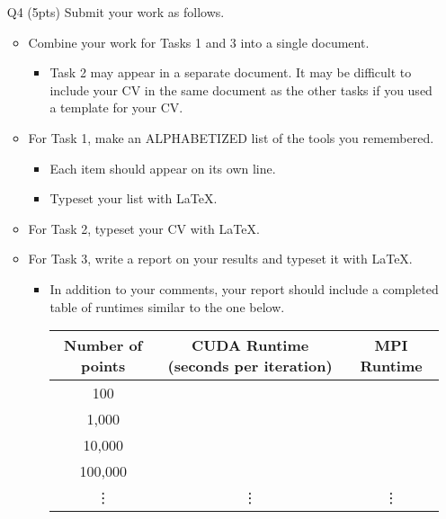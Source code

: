 \begin{itemize}
\item[Q4] (5pts) Submit your work as follows.
    \begin{itemize}
        \item Combine your work for Tasks 1 and 3 into a single document.
        \begin{itemize}
            \item Task 2 may appear in a separate document. It may be difficult to include your CV in the same document as the other tasks if you used a template for your CV.
        \end{itemize}
        \item For Task 1, make an ALPHABETIZED list of the tools you remembered.
        \begin{itemize}
            \item Each item should appear on its own line.
            \item Typeset your list with \LaTeX{}.
        \end{itemize}
        \item For Task 2, typeset your CV with \LaTeX{}.
        \item For Task 3, write a report on your results and typeset it with \LaTeX{}.
        \begin{itemize}
            \item  In addition to your comments, your report should include a completed table of runtimes similar to the one below.\\[10pt]
            \begin{tabular}{c|c|c}
Number of points & CUDA Runtime (seconds per iteration) & MPI Runtime\\
\hline\hline
100 & \\
\hline
1,000 & \\
\hline
10,000 & \\
\hline
100,000 & \\
\vdots & \vdots & \vdots
            \end{tabular}
        \end{itemize}
    \end{itemize}
\end{itemize}
